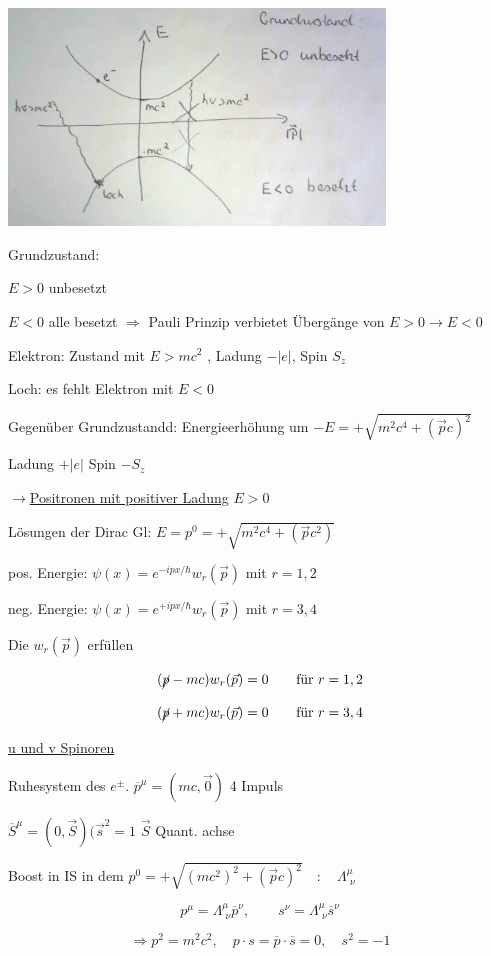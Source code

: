 \includegraphics[width=0.75\textwidth]{kap06_02.png}

Grundzustand:

 \(E>0\) unbesetzt

\(E<0\) alle besetzt \(\Rightarrow \) Pauli Prinzip verbietet Übergänge von \(E>0 \rightarrow E<0 \)

Elektron: Zustand mit \(E>mc^2\) , Ladung \(-|e|\), Spin \(S_z\)

Loch: es fehlt Elektron mit \(E<0\)

Gegenüber Grundzustandd: Energieerhöhung um \(-E = +\sqrt{m^2c^4+(\vec pc)^2}\)

Ladung \(+|e|\)
Spin \(-S_z\)

\(\rightarrow \)\underline{Positronen mit positiver Ladung} \(E>0\)

Lösungen der Dirac Gl: \(E=p^0 = +\sqrt{m^2c^4+(\vec pc^2)}\)

pos. Energie: \(\psi(x) = e^{-ipx/\hbar}w_r(\vec p)\) mit \(r=1,2\)

neg. Energie: \(\psi(x) = e^{+ipx/\hbar}w_r(\vec p)\) mit \(r=3,4\)

Die \(w_r(\vec p)\) erfüllen

\[(\cancel p - mc)w_r(\vec p) = 0 \qquad\text{für } r=1,2\]

\[(\cancel p + mc)w_r(\vec p) = 0 \qquad\text{für } r=3,4\]


\underline{u und v Spinoren}


Ruhesystem des \(e^{\pm}\). \(\overline p^\mu = (mc,\vec 0)\) 4 Impuls 

\(\overline S^\mu = (0,\vec S)(\vec s^2=1\)  \(\vec S\) Quant. achse


Boost in IS in dem \(p^0 = +\sqrt{(mc^2)^2+(\vec p c)^2}\quad:\quad \Lambda^\mu_{\,\,\nu} \)

\[p^\mu = \Lambda^\mu_{\,\,\nu}\overline p^\nu, \qquad s^\nu =\Lambda^\mu_{\,\,\nu}\overline s^\nu \]

\[\Rightarrow p^2=m^2c^2, \quad p\cdot s = \overline p\cdot \overline s = 0,\quad s^2 = -1\]

